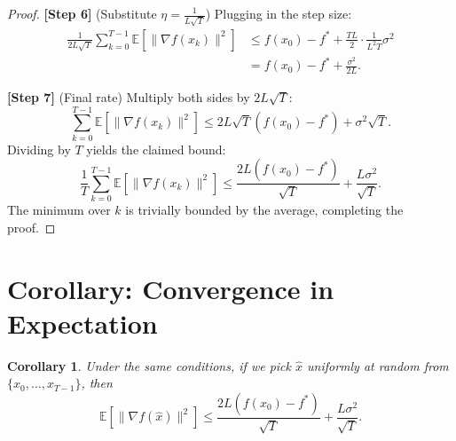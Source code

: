\documentclass{article}
\newtheorem{corollary}{Corollary}
\begin{document}
\begin{proof}
    \noindent \textbf{[Step 6]} (Substitute $\eta = \frac{1}{L\sqrt{T}}$) Plugging in the step size:
    \begin{align}
        \frac{1}{2L\sqrt{T}}\sum_{k=0}^{T-1} \mathbb{E}[\|\nabla f(x_k)\|^2] &\le f(x_0)-f^* + \frac{T L}{2}\cdot\frac{1}{L^2 T}\sigma^2 \\
        &= f(x_0)-f^* + \frac{\sigma^2}{2L}. \tag{6}
    \end{align}

    \noindent \textbf{[Step 7]} (Final rate) Multiply both sides by $2L\sqrt{T}$:
    \begin{equation}
        \sum_{k=0}^{T-1} \mathbb{E}[\|\nabla f(x_k)\|^2] \le 2L\sqrt{T}(f(x_0)-f^*) + \sigma^2\sqrt{T}. \tag{7}
    \end{equation}
    Dividing by $T$ yields the claimed bound:
    \begin{equation}
        \frac{1}{T}\sum_{k=0}^{T-1} \mathbb{E}[\|\nabla f(x_k)\|^2] \le \frac{2L(f(x_0)-f^*)}{\sqrt{T}} + \frac{L\sigma^2}{\sqrt{T}}. \tag{8}
    \end{equation}
    The minimum over $k$ is trivially bounded by the average, completing the proof.
\end{proof}

\section{Corollary: Convergence in Expectation}
\begin{corollary}
    Under the same conditions, if we pick $\hat{x}$ uniformly at random from $\{x_0,\dots,x_{T-1}\}$, then
    \begin{equation}
        \mathbb{E}[\|\nabla f(\hat{x})\|^2] \le \frac{2L(f(x_0)-f^*)}{\sqrt{T}} + \frac{L\sigma^2}{\sqrt{T}}.
    \end{equation}
\end{corollary}

\end{document}
